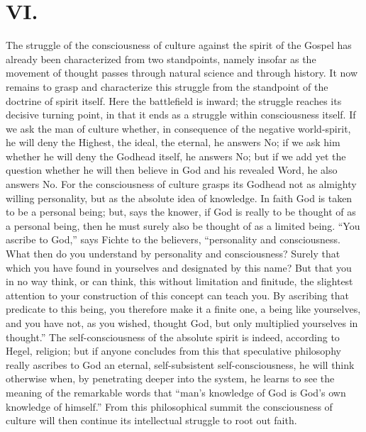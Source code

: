 \documentclass[12pt]{book}
\newcommand{\opage}[1]{\marginnote{\footnotesize\textit{[#1]}}}
\begin{document}
\chapter*{VI.}
\label{ch:vi}
\opage{90}\setcounter{footnote}{0}%
The struggle of the consciousness of culture against the spirit of the
Gospel has already been characterized from two standpoints, namely
insofar as the movement of thought passes through natural science and
through history. It now remains to grasp and characterize this struggle
from the standpoint of the doctrine of spirit itself. Here the
battlefield is inward; the struggle reaches its decisive turning point,
in that it ends as a struggle within consciousness itself. If we ask the
man of culture whether, in consequence of the negative world-spirit, he
will deny the Highest, the ideal, the eternal, he answers No; if we ask
him whether he will deny the Godhead itself, he answers No; but if we
add yet the question whether he will then believe in God and his
revealed Word, he also answers No. For the consciousness of culture
grasps its Godhead not as almighty willing personality, but as the
absolute idea of knowledge. In faith God is taken to be a personal
being; but, says the knower, if God is really to be thought of as a
personal being, then he must surely also be thought of as a limited
being. ``You ascribe to God,'' says Fichte to the believers,
``personality and consciousness. What then do you understand by
personality and consciousness? Surely that which you have found in
yourselves and designated by this name? But that you in no
\opage{91}\setcounter{footnote}{0}%
way think, or can think, this without limitation and finitude, the
slightest attention to your construction of this concept can teach
you. By ascribing that predicate to this being, you therefore make it a
finite one, a being like yourselves, and you have not, as you wished,
thought God, but only multiplied yourselves in thought.'' The
self-consciousness of the absolute spirit is indeed, according to Hegel,
religion; but if anyone concludes from this that speculative philosophy
really ascribes to God an eternal, self-subsistent self-consciousness,
he will think otherwise when, by penetrating deeper into the system, he
learns to see the meaning of the remarkable words that ``man's
knowledge of God is God's own knowledge of himself.'' From this
philosophical summit the consciousness of culture will then continue its
intellectual struggle to root out faith.
\end{document}
